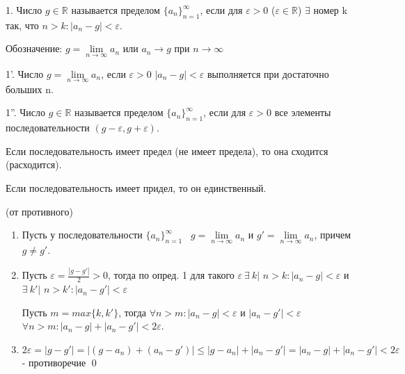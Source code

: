 \documentclass{article}
\begin{document}


1. Число $g \in \mathbb{R}$ называется пределом $\{a_n\}^{\infty}_{n=1}$, если для \forall $\varepsilon>0$ ($\varepsilon \in \mathbb{R}$) $\exists$ номер k так, что \forall $n>k: |a_n-g|<\varepsilon$.

Обозначение: $g=\lim\limits_{n\to\infty}{a_n}$ или $a_n \rightarrow {g}$ при $n \rightarrow {\infty}$

1'. Число $g=\lim\limits_{n\to\infty}{a_n}$, если \forall $\varepsilon>0$ \linespread{1} $|a_n-g|<\varepsilon$ выполняется при достаточно больших n.

1''. Число $g \in \mathbb{R}$ называется пределом $\{a_n\}^{\infty}_{n=1}$, если для \forall $\varepsilon>0$ все элементы последовательности \in \linespread{1} $(g-\varepsilon, g+\varepsilon)$.


Если последовательность имеет предел (не имеет предела), то она сходится (расходится).

\theorem

Если последовательность имеет придел, то он единственный.

\proof (от противного)

\begin {enumerate}

\item  Пусть у последовательности $\{a_n\}^{\infty}_{n=1}$ \exists \ $g=\lim\limits_{n\to\infty}{a_n}$ и $g'=\lim\limits_{n\to\infty}{a_n}$, причем $g \neq g'$.

\item Пусть $\varepsilon=\frac{|g-g'|}{2}>0$, тогда по опред. 1 для такого $\varepsilon\ \exists\ k|$ \linespread{1} \forall $n>k: |a_n-g|<\varepsilon$ и $\exists\ k'|$ \linespread{1} \forall $n>k': |a_n-g'|<\varepsilon$

Пусть $m=max\{k, k'\}$, тогда $\forall n>m: |a_n-g|<\varepsilon$ и $|a_n-g'|<\varepsilon$ \Rightarrow\  $\forall n>m: |a_n-g|+|a_n-g'|<2\varepsilon$.

\item $2\varepsilon=|g-g'|=|(g-a_n)+(a_n-g')|\leq|g-a_n|+|a_n-g'|=|a_n-g|+|a_n-g'|<2\varepsilon$ - противоречие \qed

\end{enumerate}
\end{document}
